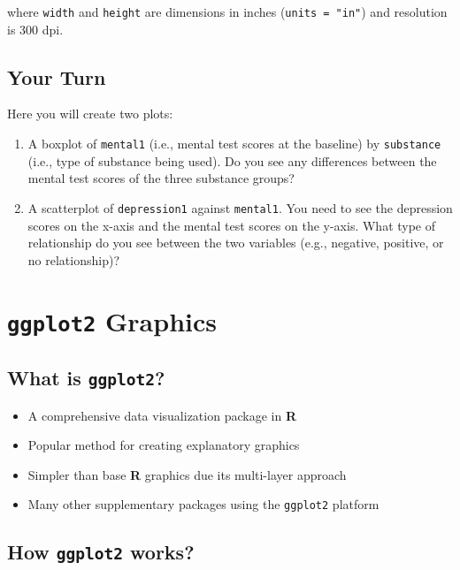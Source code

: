 \documentclass[]{book}
\providecommand{\tightlist}{%
  \setlength{\itemsep}{0pt}\setlength{\parskip}{0pt}}
\begin{document}
where \texttt{width} and \texttt{height} are dimensions in inches (\texttt{units\ =\ "in"}) and resolution is 300 dpi.

\hypertarget{your-turn-6}{%
\subsection{Your Turn}\label{your-turn-6}}

Here you will create two plots:

\begin{enumerate}
\def\labelenumi{\arabic{enumi}.}
\item
  A boxplot of \texttt{mental1} (i.e., mental test scores at the baseline) by \texttt{substance} (i.e., type of substance being used). Do you see any differences between the mental test scores of the three substance groups?
\item
  A scatterplot of \texttt{depression1} against \texttt{mental1}. You need to see the depression scores on the x-axis and the mental test scores on the y-axis. What type of relationship do you see between the two variables (e.g., negative, positive, or no relationship)?
\end{enumerate}

\hypertarget{ggplot2-graphics}{%
\section{\texorpdfstring{\texttt{ggplot2} Graphics}{ggplot2 Graphics}}\label{ggplot2-graphics}}

\hypertarget{what-is-ggplot2}{%
\subsection{\texorpdfstring{What is \texttt{ggplot2}?}{What is ggplot2?}}\label{what-is-ggplot2}}

\begin{itemize}
\tightlist
\item
  A comprehensive data visualization package in \textbf{R}
\item
  Popular method for creating explanatory graphics
\item
  Simpler than base \textbf{R} graphics due its multi-layer approach
\item
  Many other supplementary packages using the \texttt{ggplot2} platform
\end{itemize}

\hypertarget{how-ggplot2-works}{%
\subsection{\texorpdfstring{How \texttt{ggplot2} works?}{How ggplot2 works?}}\label{how-ggplot2-works}}
\end{document}

